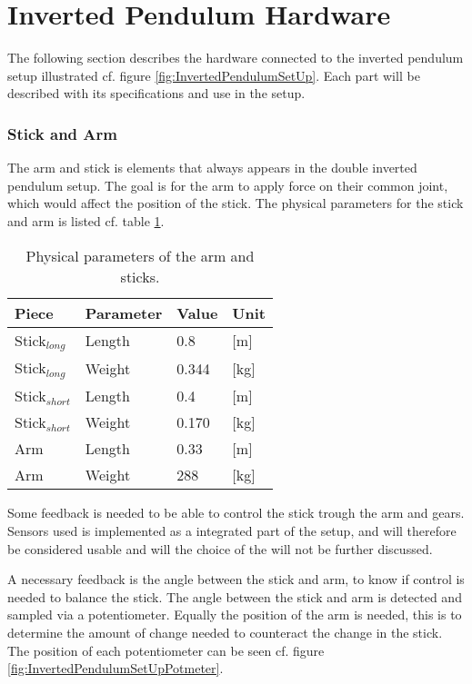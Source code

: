 \section{Inverted Pendulum Hardware}
The following section describes the hardware connected to the inverted pendulum setup illustrated cf. figure \ref{fig:InvertedPendulumSetUp}.
Each part will be described with its specifications and use in the setup.

\subsubsection{Stick and Arm}
The arm and stick is elements that always appears in the double inverted pendulum setup. The goal is for the arm to apply force on their common joint, which would affect the position of the stick. The physical parameters for the stick and arm is listed cf. table \ref{DimensionsStick}.

\begin{table}[htbp]
\centering
\begin{tabular}{llll}
\hline
Piece           & Parameter & Value & Unit \\ \hline
Stick$_{long}$  & Length    & 0.8   & [m]    \\
Stick$_{long}$  & Weight    & 0.344 & [kg]    \\ \hline
Stick$_{short}$ & Length    & 0.4   & [m]    \\
Stick$_{short}$ & Weight    & 0.170 & [kg]    \\ \hline
Arm             & Length    & 0.33  & [m]    \\
Arm             & Weight    & 288   & [kg]   \\ \hline
\end{tabular}
\caption{Physical parameters of the arm and sticks.}
\label{DimensionsStick}
\end{table}

Some feedback is needed to be able to control the stick trough the arm and gears. Sensors used is implemented as a integrated part of the setup, and will therefore be considered usable and will the choice of the will not be further discussed.

A necessary feedback is the angle between the stick and arm, to know if control is needed to balance the stick. The angle between the stick and arm is detected and sampled via a potentiometer. Equally the position of the arm is needed, this is to determine the amount of change needed to counteract the change in the stick. The position of each potentiometer can be seen cf. figure \ref{fig:InvertedPendulumSetUpPotmeter}. 

